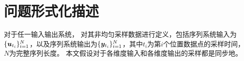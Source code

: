 
\section{问题形式化描述}
\label{sec:5_formal}
对于任一输入输出系统，
对其非均匀采样数据进行定义，包括序列系统输入为$\{\boldsymbol{u}_{t_i}\}_{i=1}^{N}$，以及序列系统输出为$\{\boldsymbol{y}_{t_i}\}_{i=1}^{N}$，其中$t_i$为第$i$个位置数据点的采样时间，$N$为完整序列长度。
本文假设对于各维度输入和各维度输出的采样都是同步地。

